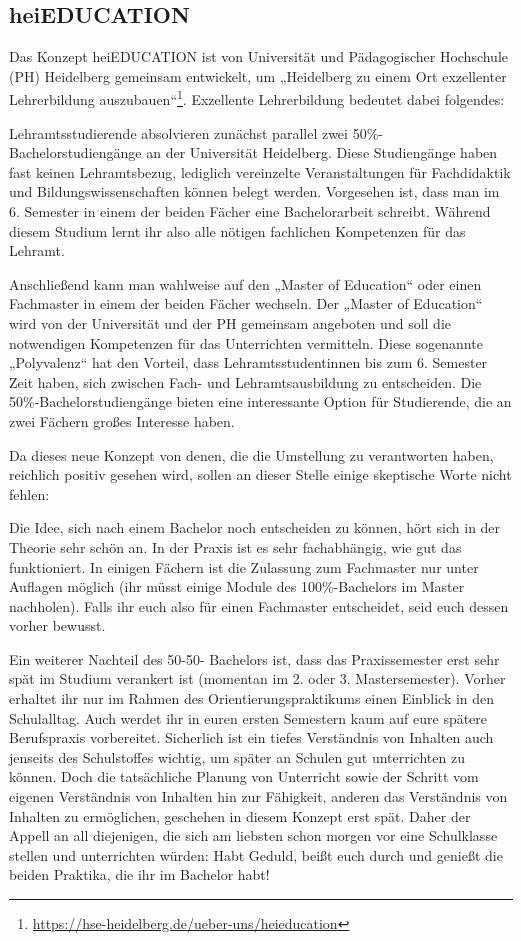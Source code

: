 \subsection{heiEDUCATION}

Das Konzept heiEDUCATION ist von Universität und Pädagogischer Hochschule (PH) Heidelberg gemeinsam entwickelt, um „Heidelberg zu einem Ort exzellenter Lehrerbildung auszubauen“\footnote{\url{https://hse-heidelberg.de/ueber-uns/heieducation}}. Exzellente Lehrerbildung bedeutet dabei folgendes:

Lehramtsstudierende absolvieren zunächst parallel zwei 50\%-Ba\-che\-lor\-stu\-di\-en\-gän\-ge an der Universität Heidelberg. Diese Studiengänge haben fast keinen Lehramtsbezug, lediglich vereinzelte Veranstaltungen für Fachdidaktik und Bildungswissenschaften können belegt werden. Vorgesehen ist, dass man im 6. Semester in einem der beiden Fächer eine Bachelorarbeit schreibt. Während diesem Studium lernt ihr also alle nötigen fachlichen Kompetenzen für das Lehramt.

Anschließend kann man wahlweise auf den „Master of Education“ oder einen Fachmaster in einem der beiden Fächer wechseln. Der „Master of Education“ wird von der Universität und der PH gemeinsam angeboten und soll die notwendigen Kompetenzen für das Unterrichten vermitteln. Diese sogenannte „Polyvalenz“ hat den Vorteil, dass Lehramtsstudentinnen bis zum 6. Semester Zeit haben, sich zwischen Fach- und Lehramtsausbildung zu entscheiden. Die 50\%-Bachelorstudiengänge bieten eine interessante Option für Studierende, die an zwei Fächern großes Interesse haben.

Da dieses neue Konzept von denen, die die Umstellung zu verantworten haben, reichlich positiv gesehen wird, sollen an dieser Stelle einige skeptische Worte nicht fehlen:

Die Idee, sich nach einem Bachelor noch entscheiden zu können, hört sich in der Theorie sehr schön an. In der Praxis ist es sehr fachabhängig, wie gut das funktioniert. In einigen Fächern ist die Zulassung zum Fachmaster nur unter Auflagen möglich (\dah ihr müsst einige Module des 100\%-Bachelors im Master nachholen). Falls ihr euch also für einen Fachmaster entscheidet, seid euch dessen vorher bewusst.

Ein weiterer Nachteil des 50-50- Bachelors ist, dass das Praxissemester erst sehr spät im Studium verankert ist (momentan im 2. oder 3. Mastersemester). Vorher erhaltet ihr nur im Rahmen des Orientierungspraktikums einen Einblick in den Schulalltag. Auch werdet ihr in euren ersten Semestern kaum auf eure spätere Berufspraxis vorbereitet. Sicherlich ist ein tiefes Verständnis von Inhalten auch jenseits des Schulstoffes wichtig, um später an Schulen gut unterrichten zu können. Doch die tatsächliche Planung von Unterricht sowie der Schritt vom eigenen Verständnis von Inhalten hin zur Fähigkeit, anderen das Verständnis von Inhalten zu ermöglichen, geschehen in diesem Konzept erst spät. Daher der Appell an all diejenigen, die sich am liebsten schon morgen vor eine Schulklasse stellen und unterrichten würden: Habt Geduld, beißt euch durch und genießt die beiden Praktika, die ihr im Bachelor habt!

